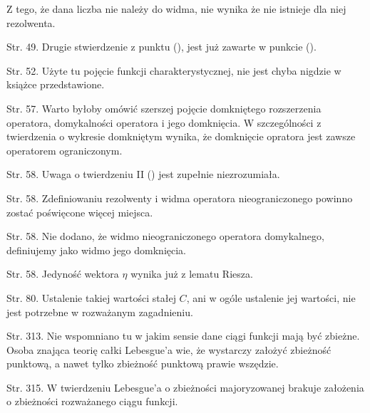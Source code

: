 \documentclass[a4paper,11pt]{article}
\begin{document}
 Z tego, że dana liczba nie należy do widma, nie wynika
że nie istnieje dla niej rezolwenta.


 Str. 49. Drugie stwierdzenie z punktu (), jest już
  zawarte w punkcie ().

 Str. 52. Użyte tu pojęcie funkcji charakterystycznej, nie jest
  chyba nigdzie w książce przedstawione.

 Str. 57. Warto byłoby omówić szerszej pojęcie domkniętego
  rozszerzenia operatora, domykalności operatora i jego domknięcia. W
  szczególności z twierdzenia o wykresie domkniętym wynika, że
  domknięcie opratora jest zawsze operatorem ograniczonym.

 Str. 58. Uwaga o twierdzeniu II () jest zupełnie
  niezrozumiała.

 Str. 58. Zdefiniowaniu rezolwenty i widma operatora
  nieograniczonego powinno zostać poświęcone więcej miejsca.

 Str. 58. Nie dodano, że widmo nieograniczonego operatora
  domykalnego, definiujemy jako widmo jego domknięcia.

 Str. 58. Jedyność wektora $\eta$ wynika już z lematu Riesza.

 Str. 80. Ustalenie takiej wartości stałej $C$, ani w ogóle
  ustalenie jej wartości, nie jest potrzebne w rozważanym zagadnieniu.

 Str. 313. Nie wspomniano tu w jakim sensie dane ciągi funkcji
  mają być zbieżne. Osoba znająca teorię całki Lebesgue'a wie, że
  wystarczy założyć zbieżność punktową, a nawet tylko zbieżność
  punktową prawie wszędzie.

 Str. 315. W twierdzeniu Lebesgue'a o zbieżności majoryzowanej
  brakuje założenia o zbieżności rozważanego ciągu funkcji.




\end{document}
